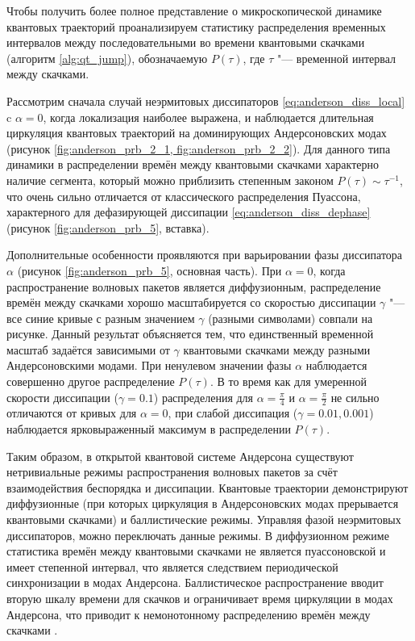 Чтобы получить более полное представление о микроскопической динамике квантовых траекторий проанализируем статистику распределения временных интервалов между последовательными во времени квантовыми скачками (алгоритм \ref{alg:qt_jump}), обозначаемую \(P(\tau)\), где \(\tau\) "--- временной интервал между скачками.

Рассмотрим сначала случай неэрмитовых диссипаторов \cref{eq:anderson_diss_local} c \(\alpha=0\), когда локализация наиболее выражена, и наблюдается длительная циркуляция квантовых  траекторий на доминирующих Андерсоновских модах (рисунок \cref{fig:anderson_prb_2_1, fig:anderson_prb_2_2}). 
Для данного типа динамики в распределении времён между квантовыми скачками  характерно наличие сегмента, который можно приблизить степенным законом \(P(\tau) \sim \tau^{-1}\), что очень сильно отличается от классического распределения Пуассона, характерного для дефазирующей диссипации \cref{eq:anderson_diss_dephase} (рисунок \cref{fig:anderson_prb_5}, вставка).

Дополнительные особенности проявляются при варьировании фазы диссипатора \(\alpha\) (рисунок \cref{fig:anderson_prb_5}, основная часть).
При \(\alpha=0\), когда распространение волновых пакетов является диффузионным, распределение времён между скачками хорошо масштабируется со скоростью диссипации \(\gamma\) "--- все синие кривые с разным значением \(\gamma\) (разными символами) совпали на рисунке.
Данный результат объясняется тем, что единственный временной масштаб задаётся зависимыми от \(\gamma\) квантовыми скачками между разными Андерсоновскими модами.
При ненулевом значении фазы \(\alpha\) наблюдается совершенно другое распределение \(P(\tau)\). 
В то время как для умеренной скорости диссипации (\(\gamma = 0.1\)) распределения для \(\alpha = \frac{\pi}{4}\) и \(\alpha = \frac{\pi}{2}\) не сильно отличаются от кривых для \(\alpha=0\), при слабой диссипация (\(\gamma = 0.01, 0.001\)) наблюдается ярковыраженный максимум в распределении \(P(\tau)\).

Таким образом, в открытой квантовой системе Андерсона существуют нетривиальные режимы распространения волновых пакетов за счёт взаимодействия беспорядка и диссипации. Квантовые траектории демонстрируют диффузионные (при которых циркуляция в Андерсоновских модах прерывается квантовыми скачками) и баллистические режимы. Управляя фазой неэрмитовых диссипаторов, можно переключать данные режимы. В диффузионном режиме статистика времён между квантовыми скачками не является пуассоновской и имеет степенной интервал, что является следствием периодической синхронизации в модах Андерсона. Баллистическое распространение вводит вторую шкалу времени для скачков и ограничивает время циркуляции в модах Андерсона, что приводит к немонотонному распределению времён между скачками \cite{Yusipov2018}.

